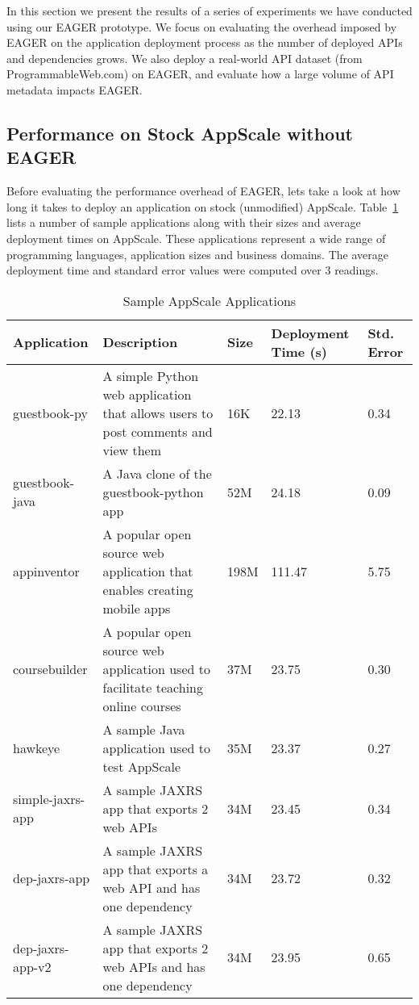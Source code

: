 In this section we present the results of a series of experiments we have conducted using our EAGER prototype. We focus
on evaluating the overhead imposed by EAGER on the application deployment process as the number of deployed APIs and dependencies
grows. We also deploy a real-world API dataset (from ProgrammableWeb.com) on EAGER, and evaluate how a large 
volume of API metadata impacts EAGER.

\subsection{Performance on Stock AppScale without EAGER}
Before evaluating the performance overhead of EAGER, lets take a look at how long it takes to deploy an application on stock (unmodified)
AppScale. Table~\ref{tab:sample_apps} lists a number of sample applications along with their sizes and average deployment times on AppScale.
These applications represent a wide range of programming languages, application sizes and business domains. The average
deployment time and standard error values were computed over 3 readings.

\begin{table}[ht]
\begin{center}
\begin{tabular}{| p{1.5cm} | p{3cm} | p{0.5cm} | p{1.1cm} | p{0.6cm} | }
\hline
Application & Description & Size & Deployment Time (s) & Std. Error\\ \hline
guestbook-py & A simple Python web application that allows users to post comments and view them & 16K & 22.13 & 0.34 \\ \hline
guestbook-java & A Java clone of the guestbook-python app & 52M & 24.18 & 0.09 \\ \hline
appinventor & A popular open source web application that enables creating mobile apps & 198M & 111.47 & 5.75 \\ \hline
coursebuilder & A popular open source web application used to facilitate teaching online courses & 37M & 23.75 & 0.30 \\ \hline
hawkeye & A sample Java application used to test AppScale & 35M & 23.37 & 0.27 \\ \hline
simple-jaxrs-app & A sample JAXRS app that exports 2 web APIs & 34M & 23.45 & 0.34 \\ \hline
dep-jaxrs-app & A sample JAXRS app that exports a web API and has one dependency & 34M & 23.72 & 0.32 \\ \hline
dep-jaxrs-app-v2 & A sample JAXRS app that exports 2 web APIs and has one dependency & 34M & 23.95 & 0.65 \\ \hline
\end{tabular}
\end{center}
\caption{Sample AppScale Applications}
\label{tab:sample_apps}
\end{table}

